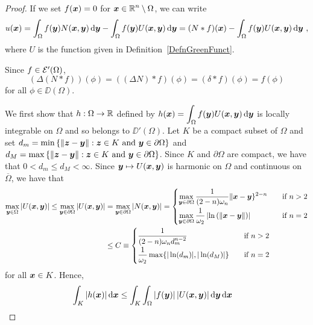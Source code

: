 \begin{proof}
If we set $f({\bm{x}}) = 0$ for
$\displaystyle {\bm{x}} \in \mathbb{R}^n \setminus \Omega$,
we can write
\[
u({\bm{x}}) = \int_{\Omega} f({\bm{y}}) N({\bm{x}},{\bm{y}}) \,\mathrm{d}{{\bm{y}}}
- \int_{\Omega} f({\bm{y}}) U({\bm{x}},{\bm{y}}) \,\mathrm{d}{{\bm{y}}}
= (N\ast f)({\bm{x}}) - \int_{\Omega} f({\bm{y}}) U({\bm{x}},{\bm{y}})
\,\mathrm{d}{{\bm{y}}} \ ,
\]
where $U$ is the function given in Definition~\ref{DefnGreenFunct}.

Since $f \in \mathcal{E}'(\Omega)$,
\[
(\Delta(N\ast f))(\phi) = ((\Delta N) \ast f)(\phi) =
(\delta \ast f)(\phi) = f(\phi)
\]
for all $\phi \in \DD(\Omega)$.

We first show that $h : \Omega \to \mathbb{R}$ defined by
$\displaystyle
h({\bm{x}}) = \int_{\Omega} f({\bm{y}}) U({\bm{x}},{\bm{y}}) \,\mathrm{d}{{\bm{y}}}$
is locally integrable on $\Omega$ and so belongs to $\DD'(\Omega)$.
Let $K$ be a compact subset of $\Omega$ and set
$\displaystyle
d_m = \min \left\{ \|{\bm{z}} - {\bm{y}}\| : {\bm{z}} \in K \ \text{and}
\ {\bm{y}} \in \partial \Omega \right\}$ and
$\displaystyle
d_M = \max \left\{ \|{\bm{z}} - {\bm{y}}\| : {\bm{z}} \in K \ \text{and}
  \ {\bm{y}} \in \partial \Omega \right\}$.  Since $K$ and
$\partial \Omega$ are compact, we have that $0 < d_m \leq d_M < \infty$.
Since ${\bm{y}} \mapsto U({\bm{x}},{\bm{y}})$ is harmonic on $\Omega$ and
continuous on $\overline{\Omega}$, we have that
\begin{align*}
\max_{{\bm{y}} \in \Omega} | U({\bm{x}},{\bm{y}}) |
\leq \max_{{\bm{y}} \in \partial \Omega} | U({\bm{x}},{\bm{y}}) |
&= \max_{{\bm{y}} \in \partial \Omega} | N({\bm{x}},{\bm{y}}) |
= \begin{cases}
\displaystyle \max_{{\bm{y}} \in \partial \Omega}
\frac{1}{(2-n)\omega_n}
\|{\bm{x}}-{\bm{y}}\}^{2-n} & \quad \text{if}\ n > 2 \\[0.8em]
\displaystyle \max_{{\bm{y}} \in \partial \Omega}
\frac{1}{\omega_2} \left|\ln\left(\|{\bm{x}}-{\bm{y}}\|\right) \right|
& \quad \text{if}\ n = 2
\end{cases} \\
&\leq C \equiv
\begin{cases}
\displaystyle \frac{1}{(2-n)\omega_n d_m^{n-2}} & \quad \text{if}\ n > 2
\\[0.8em]
\displaystyle \frac{1}{\omega_2} \max\{ |\ln(d_m)|, |\ln(d_M)| \} &
\quad \text{if}\ n = 2  
\end{cases}
\end{align*}
for all ${\bm{x}} \in K$.  Hence,
\begin{align*}
\int_K |h(\VEC{x})| \dx{\VEC{x}}
&\leq \int_K \int_{\Omega} |f(\VEC{y})|\, |U(\VEC{x},\VEC{y})|
\dx{\VEC{y}} \dx{\VEC{x}}

\end{align*}
\end{proof}
